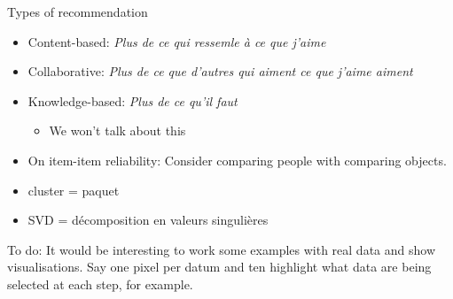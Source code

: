 




Types of recommendation
\begin{itemize}
\item Content-based: \textit{Plus de ce qui ressemle à ce que j'aime}
\item Collaborative: \textit{Plus de ce que d'autres qui aiment ce que j'aime aiment}
\item Knowledge-based: \textit{Plus de ce qu'il faut}
  \begin{itemize}
  \item We won't talk about this
  \end{itemize}
\end{itemize}

\begin{itemize}
\item On item-item reliability: Consider comparing people with comparing objects.
\item cluster = paquet
\item SVD = décomposition en valeurs singulières
\end{itemize}

To do: It would be interesting to work some examples with real data
and show visualisations.  Say one pixel per datum and ten highlight
what data are being selected at each step, for example.



